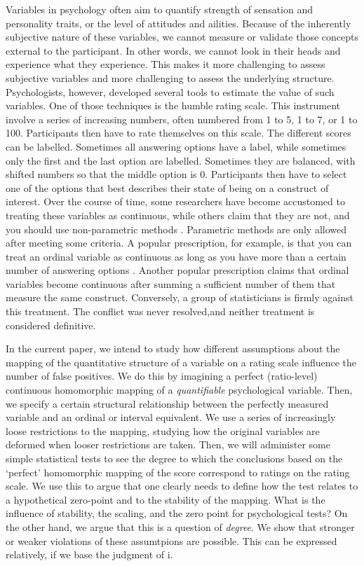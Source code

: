 \documentclass[utf8]{FrontiersinVancouver}
\begin{document}
Variables in psychology often aim to quantify strength of sensation and personality traits, or the level of attitudes and ailities. Because of the inherently subjective nature of these variables, we cannot measure or validate those concepts external to the participant. In other words, we cannot look in their heads and experience what they experience. This makes it more challenging to assess subjective variables and more challenging to assess the underlying structure. Psychologists, however, developed several tools to estimate the value of such variables. One of those techniques is the humble rating scale. This instrument involve a series of increasing numbers, often numbered from 1 to 5, 1 to 7, or 1 to 100. Participants then have to rate themselves on this scale. The different scores can be labelled. Sometimes all answering options have a label, while sometimes only the first and the last option are labelled. Sometimes they are balanced, with shifted numbers so that the middle option is 0. Participants then have to select one of the options that best describes their state of being on a construct of interest. Over the course of time, some researchers have become accustomed to treating these variables as continuous, while others claim that they are not, and you should use non-parametric methods \citep{knappTreatingOrdinalScales1990}. Parametric methods are only allowed after meeting some criteria. A popular prescription, for example, is that you can treat an ordinal variable as continuous as long as you have more than a certain number of answering options \citep{wuCanLikertScales2017}. Another popular prescription claims that ordinal variables become continuous after summing a sufficient number of them that measure the same construct. Conversely, a group of statisticians is firmly against this treatment. The conflict was never resolved,and neither treatment is considered definitive.

In the current paper, we intend to study how different assumptions about the mapping of the quantitative structure of a variable on a rating scale influence the number of false positives. We do this by imagining a perfect (ratio-level) continuous homomorphic mapping of a \textit{quantifiable} psychological variable. Then, we specify a certain structural relationship between the perfectly measured variable and an ordinal or interval equivalent. We use a series of increasingly loose restrictions to the mapping, studying how the original variables are deformed when looser restrictions are taken. Then, we will administer some simple statistical tests to see the degree to which the conclusions based on the `perfect' homomorphic mapping of the score correspond to ratings on the rating scale. We use this to argue that one clearly needs to define how the test relates to a hypothetical zero-point and to the stability of the mapping. What is the influence of stability, the scaling, and the zero point for psychological tests? On the other hand, we argue that this is a question of \textit{degree}. We show that stronger or weaker violations of these assumtpions are possible. This can be expressed relatively, if we base the judgment of i.
\end{document}

